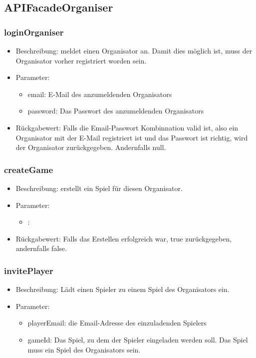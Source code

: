 \documentclass[a4paper]{scrreprt}
\begin{document}
    \subsection{APIFacadeOrganiser}
    \subsubsection{loginOrganiser}
    \begin{itemize}
        \item Beschreibung: meldet einen Organisator an. Damit dies möglich ist, muss der Organisator vorher registriert worden sein.
        \item Parameter:
        \begin{itemize}
            \item email: E-Mail des anzumeldenden Organisators
            \item password: Das Passwort des anzumeldenden Organisators
        \end{itemize}
        \item Rückgabewert: Falls die Email-Passwort Kombinnation valid ist, also ein Organisator mit der E-Mail registriert ist und das Passwort ist richtig, wird der Organisator zurückgegeben. Andernfalls null. 
    \end{itemize}
    \subsubsection{createGame}
    \begin{itemize}
        \item Beschreibung: erstellt ein Spiel für diesen Organisator.
        \item Parameter: %
        \begin{itemize}
            \item :
        \end{itemize}
        \item Rückgabewert: Falls das Erstellen erfolgreich war, true zurückgegeben, andernfalls false. 
    \end{itemize}
    \subsubsection{invitePlayer}
    \begin{itemize}
        \item Beschreibung: Lädt einen Spieler zu einem Spiel des Organisators ein.
        \item Parameter:
        \begin{itemize}
            \item playerEmail: die Email-Adresse des einzuladenden Spielers
            \item gameId: Das Spiel, zu dem der Spieler eingeladen werden soll. Das Spiel muss ein Spiel des Organisators sein.
        \end{itemize}
    \end{itemize}
\end{document}
